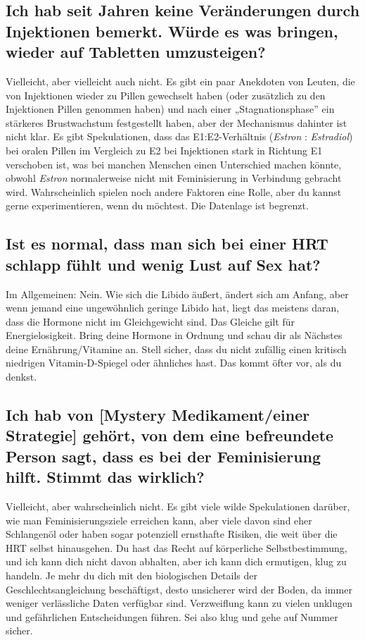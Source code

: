 \documentclass{article}
\begin{document}
{{{\subsection{Ich hab seit Jahren keine Veränderungen durch Injektionen bemerkt. Würde es was bringen, wieder auf Tabletten umzusteigen?}

Vielleicht, aber vielleicht auch nicht. Es gibt ein paar Anekdoten von Leuten, die von Injektionen wieder zu Pillen gewechselt haben (oder zusätzlich zu den Injektionen Pillen genommen haben) und nach einer „Stagnationsphase” ein stärkeres Brustwachstum festgestellt haben, aber der Mechanismus dahinter ist nicht klar. Es gibt Spekulationen, dass das E1:E2-Verhältnis (\textit{Estron} : \textit{Estradiol}) bei oralen Pillen im Vergleich zu E2 bei Injektionen stark in Richtung E1 verschoben ist, was bei manchen Menschen einen Unterschied machen könnte, obwohl \textit{Estron} normalerweise nicht mit Feminisierung in Verbindung gebracht wird. Wahrscheinlich spielen noch andere Faktoren eine Rolle, aber du kannst gerne experimentieren, wenn du möchtest. Die Datenlage ist begrenzt.

\subsection{Ist es normal, dass man sich bei einer HRT schlapp fühlt und wenig Lust auf Sex hat?}

Im Allgemeinen: Nein. Wie sich die Libido äußert, ändert sich am Anfang, aber wenn jemand eine ungewöhnlich geringe Libido hat, liegt das meistens daran, dass die Hormone nicht im Gleichgewicht sind. Das Gleiche gilt für Energielosigkeit. Bring deine Hormone in Ordnung und schau dir als Nächstes deine Ernährung/Vitamine an. Stell sicher, dass du nicht zufällig einen kritisch niedrigen Vitamin-D-Spiegel oder ähnliches hast. Das kommt öfter vor, als du denkst.

\subsection{Ich hab von [Mystery Medikament/einer Strategie] gehört, von dem eine befreundete Person sagt, dass es bei der Feminisierung hilft. Stimmt das wirklich?}

Vielleicht, aber wahrscheinlich nicht. Es gibt viele wilde Spekulationen darüber, wie man Feminisierungsziele erreichen kann, aber viele davon sind eher Schlangenöl oder haben sogar potenziell ernsthafte Risiken, die weit über die HRT selbst hinausgehen. Du hast das Recht auf körperliche Selbstbestimmung, und ich kann dich nicht davon abhalten, aber ich kann dich ermutigen, klug zu handeln. Je mehr du dich mit den biologischen Details der Geschlechtsangleichung beschäftigst, desto unsicherer wird der Boden, da immer weniger verlässliche Daten verfügbar sind. Verzweiflung kann zu vielen unklugen und gefährlichen Entscheidungen führen. Sei also klug und gehe auf Nummer sicher.

}}}
\end{document}
